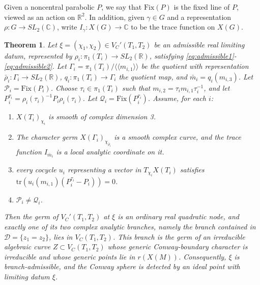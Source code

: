 \documentclass{article}
\theoremstyle{plain}
\newtheorem{theorem}{Theorem}[section]
\theoremstyle{definition}
\theoremstyle{plain}
\theoremstyle{plain}
\theoremstyle{plain}
\theoremstyle{remark}
\theoremstyle{remark}
\theoremstyle{plain}
\theoremstyle{plain}
\newcounter{main}
\theoremstyle{plain}
\theoremstyle{plain}
\begin{document}
\medskip

Given a noncentral parabolic $P$, we say that $\mathrm{Fix}(P)$ is the fixed line of $P$, viewed as an action on $\mathbb{R}^2$. In addition, given $\gamma \in G$ and a representation $\rho: G \to SL_2(\mathbb C)$, write $I_\gamma: X(G) \to \mathbb C$ to be the trace function on $X(G)$.

\begin{theorem}\label{thm:main}
Let $\xi = (\chi_1, \chi_2) \in V_C'(T_1, T_2)$ be an admissible real limiting datum, represented by $\rho_i: \pi_1(T_i) \to SL_2(\mathbb{R})$, satisfying \eqref{eq:admissible1}-\eqref{eq:admissible2}. Let $\Gamma_i = \pi_1(T_i) / \langle \langle m_{i,1} \rangle \rangle$ be the quotient with representation $\bar\rho_i: \Gamma_i \to SL_2(\mathbb R)$, $q_i: \pi_1(T_i) \to \Gamma_i$ the quotient map, and $\bar m_i = q_i(m_{i, 3})$. Let $\mathcal P_i = \mathrm{Fix}(P_i)$. Choose $\tau_i \in \pi_1(T_i)$ such that $m_{i, 2} = \tau_im_{i, 1}\tau_i^{-1}$, and let $P_i^{\tau_i} = \rho_i(\tau_i)^{-1}P_i\rho_i(\tau_i)$. Let $\mathcal Q_i = \mathrm{Fix}(P_i^{\tau_i})$. Assume, for each $i$:
\begin{enumerate}
	\item $X(T_i)_{\chi_i}$ is smooth of complex dimension 3.
	\item The character germ $X(\Gamma_i)_{\chi_{\bar\rho_i}}$ is a smooth complex curve, and the trace function $I_{\bar m_i}$ is a local analytic coordinate on it.
	\item every cocycle $u_i$ representing a vector in $T_{\chi_i}X(T_i)$ satisfies $\mathrm{tr}(u_i(m_{i, 1})(P_i^{\tau_i} - P_i)) = 0$.
	\item $\mathcal P_i \neq \mathcal Q_i$.
\end{enumerate}
Then the germ of $V_C'(T_1,T_2)$ at $\xi$ is an ordinary real quadratic node, and exactly one of its two complex analytic branches, namely the branch contained in $\mathcal D = \{z_1=z_2\}$, lies in $V_C(T_1,T_2)$. This branch is the germ of an irreducible algebraic curve $Z\subset V_C(T_1,T_2)$ whose generic Conway-boundary character is irreducible and whose generic points lie in $r(X(M))$. Consequently, $\xi$ is branch-admissible, and the Conway sphere is detected by an ideal point with limiting datum $\xi$.
\end{theorem}
\end{document}

